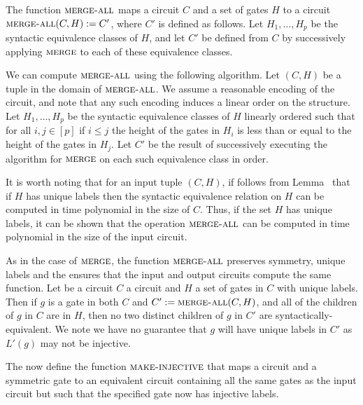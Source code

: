 \documentclass[../paper.tex]{subfiles}
\begin{document}
\begin{definition}
  \label{def:merge-all}
  The function ${\normalfont\textsc{merge-all}}$ maps a circuit $C$ and a set of gates $H$ to a
  circuit ${\normalfont\textsc{merge-all}}(C, H) := C'$, where $C'$ is defined as follows. Let
  $H_1, \ldots, H_p$ be the syntactic equivalence classes of $H$, and let $C'$
  be defined from $C$ by successively applying ${\normalfont\textsc{merge}}$ to each of these
  equivalence classes.
\end{definition}

We can compute ${\normalfont\textsc{merge-all}}$ using the following algorithm. Let $(C, H)$ be a
tuple in the domain of ${\normalfont\textsc{merge-all}}$. We assume a reasonable encoding of the
circuit, and note that any such encoding induces a linear order on the
structure. Let $H_1, \ldots, H_p$ be the syntactic equivalence classes of $H$
linearly ordered such that for all $i, j \in [p]$ if $i \leq j$ the height of
the gates in $H_i$ is less than or equal to the height of the gates in $H_j$.
Let $C'$ be the result of successively executing the algorithm for ${\normalfont\textsc{merge}}$
on each such equivalence class in order.

It is worth noting that for an input tuple $(C, H)$, if follows from
Lemma~\cite{lem:unique-labels-syntactic-equiv} that if $H$ has unique labels
then the syntactic equivalence relation on $H$ can be computed in time
polynomial in the size of $C$. Thus, if the set $H$ has unique labels, it can be
shown that the operation ${\normalfont\textsc{merge-all}}$ can be computed in time polynomial in
the size of the input circuit.

As in the case of ${\normalfont\textsc{merge}}$, the function ${\normalfont\textsc{merge-all}}$ preserves
symmetry, unique labels and the ensures that the input and output circuits
compute the same function. Let be a circuit $C$ a circuit and $H$ a set of gates
in $C$ with unique labels. Then if $g$ is a gate in both $C$ and $C' :=
{\normalfont\textsc{merge-all}}(C, H)$, and all of the children of $g$ in $C$ are in $H$, then no
two distinct children of $g$ in $C'$ are syntactically-equivalent. We note we
have no guarantee that $g$ will have unique labels in $C'$ as $L'(g)$ may not be
injective.

The now define the function ${\normalfont\textsc{make-injective}}$ that maps a circuit and a
symmetric gate to an equivalent circuit containing all the same gates as the
input circuit but such that the specified gate now has injective labels.
\end{document}
